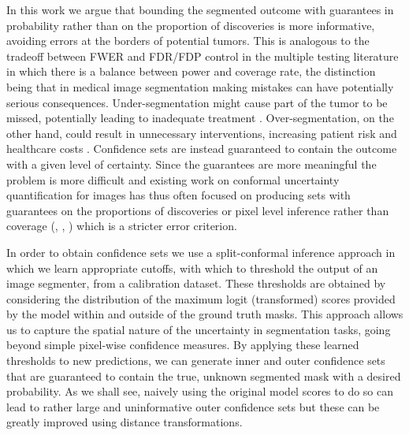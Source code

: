 In this work we argue that bounding the segmented outcome with guarantees in probability rather than on the proportion of discoveries is more informative, avoiding errors at the borders of potential tumors. This is analogous to the tradeoff between FWER and FDR/FDP control in the multiple testing literature in which there is a balance between power and coverage rate, the distinction being that in medical image segmentation making mistakes can have potentially serious consequences. Under-segmentation might cause part of the tumor to be missed, potentially leading to inadequate treatment \citep{Jalalifar2022}. Over-segmentation, on the other hand, could result in unnecessary interventions, increasing patient risk and healthcare costs \citep{Gupta2020, Patz2014}. Confidence sets are instead guaranteed to contain the outcome with a given level of certainty. Since the guarantees are more meaningful the problem is more difficult and existing work on conformal uncertainty quantification for images has thus often focused on producing sets with guarantees on the proportions of discoveries or pixel level inference rather than coverage (\cite{Bates2021}, \cite{Wieslander2020}, \cite{Mossina2024}) which is a stricter error criterion. 

In order to obtain confidence sets we use a split-conformal inference approach in which we learn appropriate cutoffs, with which to threshold the output of an image segmenter, from a calibration dataset. These thresholds are obtained by considering the distribution of the maximum logit (transformed) scores provided by the model within and outside of the ground truth masks. This approach allows us to capture the spatial nature of the uncertainty in segmentation tasks, going beyond simple pixel-wise confidence measures. By applying these learned thresholds to new predictions, we can generate inner and outer confidence sets that are guaranteed to contain the true, unknown segmented mask with a desired probability. As we shall see, naively using the original model scores to do so can lead to rather large and uninformative outer confidence sets but these can be greatly improved using distance transformations. 
 